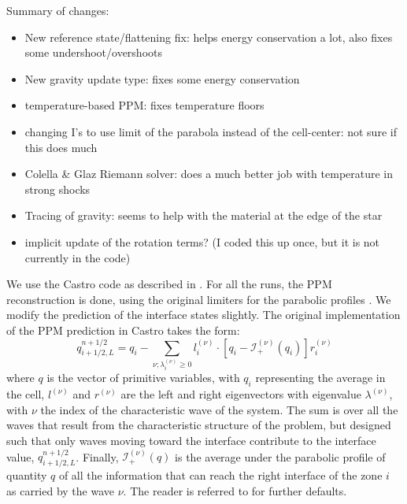 \documentclass[12pt,preprint]{aastex}
\begin{document}
Summary of changes:
\begin{itemize}
\item New reference state/flattening fix: helps energy conservation a
  lot, also fixes some undershoot/overshoots

\item New gravity update type: fixes some energy conservation

\item temperature-based PPM: fixes temperature floors

\item changing I's to use limit of the parabola instead of the
  cell-center: not sure if this does much

\item Colella \& Glaz Riemann solver: does a much better job with
  temperature in strong shocks

\item Tracing of gravity: seems to help with the material at the edge
  of the star

\item implicit update of the rotation terms?  (I coded this up once, but
  it is not currently in the code)
\end{itemize}

We use the Castro code as described in \citet{castro}.  For all the
runs, the PPM reconstruction is done, using the original limiters for
the parabolic profiles \citep{ppm}.  We modify the prediction of the
interface states slightly.  The original implementation of the PPM
prediction in Castro takes the form:
\begin{equation}
q_{i+1/2,L}^{n+1/2} = q_i -
   \sum_{\nu;\lambda_i^{(\nu)}\ge 0} l_i^{(\nu)} \cdot \left [
        q_i - \mathcal{I}_+^{(\nu)}(q_i)
       \right ] r_i^{(\nu)}
\end{equation}
where $q$ is the vector of primitive variables, with $q_i$
representing the average in the cell, $l^{(\nu)}$ and $r^{(\nu)}$ are
the left and right eigenvectors with eigenvalue $\lambda^{(\nu)}$,
with $\nu$ the index of the characteristic wave of the system.  The
sum is over all the waves that result from the characteristic
structure of the problem, but designed such that only waves moving
toward the interface contribute to the interface value,
$q_{i+1/2,L}^{n+1/2}$.  Finally, $\mathcal{I}_+^{(\nu)}(q)$ is the
average under the parabolic profile of quantity $q$ of all the information
that can reach the right interface of the zone $i$ as carried by the wave
$\nu$.   The reader is referred to
\citet{ppmunsplit} for further defaults.
\end{document}
